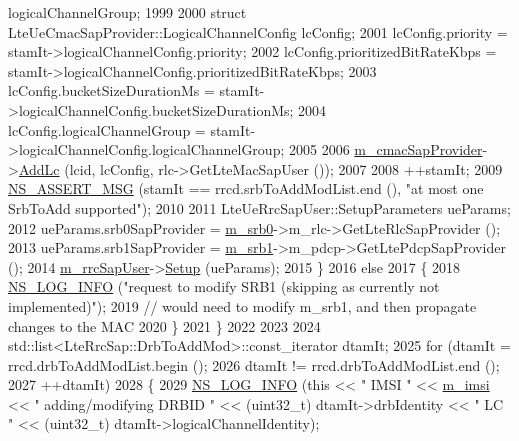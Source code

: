 \begin{DoxyCode}
      logicalChannelGroup;
1999 
2000           \textcolor{keyword}{struct }LteUeCmacSapProvider::LogicalChannelConfig lcConfig;
2001           lcConfig.priority = stamIt->logicalChannelConfig.priority;
2002           lcConfig.prioritizedBitRateKbps = stamIt->logicalChannelConfig.prioritizedBitRateKbps;
2003           lcConfig.bucketSizeDurationMs = stamIt->logicalChannelConfig.bucketSizeDurationMs;
2004           lcConfig.logicalChannelGroup = stamIt->logicalChannelConfig.logicalChannelGroup;
2005       
2006           \hyperlink{classns3_1_1LteUeRrc_a5a7bffd2040d73eb5db1aaef849d0396}{m\_cmacSapProvider}->\hyperlink{classns3_1_1LteUeCmacSapProvider_a62f2d731c336ca14e98e95a3215e92ec}{AddLc} (lcid, lcConfig, rlc->GetLteMacSapUser ());
2007       
2008           ++stamIt;
2009           \hyperlink{assert_8h_aff5ece9066c74e681e74999856f08539}{NS\_ASSERT\_MSG} (stamIt == rrcd.srbToAddModList.end (), \textcolor{stringliteral}{"at most one SrbToAdd
       supported"});     
2010           
2011           LteUeRrcSapUser::SetupParameters ueParams;
2012           ueParams.srb0SapProvider = \hyperlink{classns3_1_1LteUeRrc_a1ed76d4e424d770de67c3e39f516ac4d}{m\_srb0}->m\_rlc->GetLteRlcSapProvider ();
2013           ueParams.srb1SapProvider = \hyperlink{classns3_1_1LteUeRrc_aeb8ad627a3df9126d146bacb6dc3dce6}{m\_srb1}->m\_pdcp->GetLtePdcpSapProvider ();
2014           \hyperlink{classns3_1_1LteUeRrc_a9636e38d20aa1d75c9423d43648f2a1a}{m\_rrcSapUser}->\hyperlink{classns3_1_1LteUeRrcSapUser_a28a36243a98bfc598df870cd2fadbf85}{Setup} (ueParams);
2015         \}
2016       \textcolor{keywordflow}{else}
2017         \{
2018           \hyperlink{group__logging_gafbd73ee2cf9f26b319f49086d8e860fb}{NS\_LOG\_INFO} (\textcolor{stringliteral}{"request to modify SRB1 (skipping as currently not implemented)"});
2019           \textcolor{comment}{// would need to modify m\_srb1, and then propagate changes to the MAC}
2020         \}
2021     \}
2022 
2023 
2024   std::list<LteRrcSap::DrbToAddMod>::const\_iterator dtamIt;
2025   \textcolor{keywordflow}{for} (dtamIt = rrcd.drbToAddModList.begin ();
2026        dtamIt != rrcd.drbToAddModList.end ();
2027        ++dtamIt)
2028     \{
2029       \hyperlink{group__logging_gafbd73ee2cf9f26b319f49086d8e860fb}{NS\_LOG\_INFO} (\textcolor{keyword}{this} << \textcolor{stringliteral}{" IMSI "} << \hyperlink{classns3_1_1LteUeRrc_a1d825677309d17bdf729920f7dafd011}{m\_imsi} << \textcolor{stringliteral}{" adding/modifying DRBID "} << (uint32\_t) 
      dtamIt->drbIdentity << \textcolor{stringliteral}{" LC "} << (uint32\_t) dtamIt->logicalChannelIdentity);

\end{DoxyCode}
